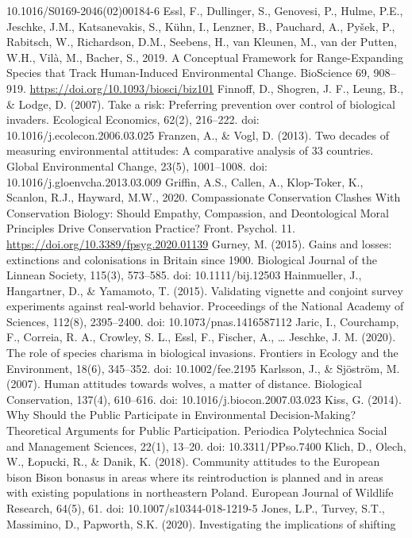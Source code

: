 \documentclass[
]{article}
\begin{document}
10.1016/S0169-2046(02)00184-6 Essl, F., Dullinger, S., Genovesi, P.,
Hulme, P.E., Jeschke, J.M., Katsanevakis, S., Kühn, I., Lenzner, B.,
Pauchard, A., Pyšek, P., Rabitsch, W., Richardson, D.M., Seebens, H.,
van Kleunen, M., van der Putten, W.H., Vilà, M., Bacher, S., 2019. A
Conceptual Framework for Range-Expanding Species that Track
Human-Induced Environmental Change. BioScience 69, 908--919.
\url{https://doi.org/10.1093/biosci/biz101} Finnoff, D., Shogren, J. F.,
Leung, B., \& Lodge, D. (2007). Take a risk: Preferring prevention over
control of biological invaders. Ecological Economics, 62(2), 216--222.
doi: 10.1016/j.ecolecon.2006.03.025 Franzen, A., \& Vogl, D. (2013). Two
decades of measuring environmental attitudes: A comparative analysis of
33 countries. Global Environmental Change, 23(5), 1001--1008. doi:
10.1016/j.gloenvcha.2013.03.009 Griffin, A.S., Callen, A., Klop-Toker,
K., Scanlon, R.J., Hayward, M.W., 2020. Compassionate Conservation
Clashes With Conservation Biology: Should Empathy, Compassion, and
Deontological Moral Principles Drive Conservation Practice? Front.
Psychol. 11. \url{https://doi.org/10.3389/fpsyg.2020.01139} Gurney, M.
(2015). Gains and losses: extinctions and colonisations in Britain since
1900. Biological Journal of the Linnean Society, 115(3), 573--585. doi:
10.1111/bij.12503 Hainmueller, J., Hangartner, D., \& Yamamoto, T.
(2015). Validating vignette and conjoint survey experiments against
real-world behavior. Proceedings of the National Academy of Sciences,
112(8), 2395--2400. doi: 10.1073/pnas.1416587112 Jaric, I., Courchamp,
F., Correia, R. A., Crowley, S. L., Essl, F., Fischer, A., \ldots{}
Jeschke, J. M. (2020). The role of species charisma in biological
invasions. Frontiers in Ecology and the Environment, 18(6), 345--352.
doi: 10.1002/fee.2195 Karlsson, J., \& Sjöström, M. (2007). Human
attitudes towards wolves, a matter of distance. Biological Conservation,
137(4), 610--616. doi: 10.1016/j.biocon.2007.03.023 Kiss, G. (2014). Why
Should the Public Participate in Environmental Decision-Making?
Theoretical Arguments for Public Participation. Periodica Polytechnica
Social and Management Sciences, 22(1), 13--20. doi: 10.3311/PPso.7400
Klich, D., Olech, W., Łopucki, R., \& Danik, K. (2018). Community
attitudes to the European bison Bison bonasus in areas where its
reintroduction is planned and in areas with existing populations in
northeastern Poland. European Journal of Wildlife Research, 64(5), 61.
doi: 10.1007/s10344-018-1219-5 Jones, L.P., Turvey, S.T., Massimino, D.,
Papworth, S.K. (2020). Investigating the implications of shifting
\end{document}
